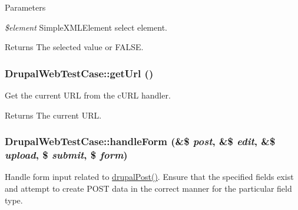 \begin{DoxyParams}{Parameters}
\item[{\em \$element}]SimpleXMLElement select element. \end{DoxyParams}
\begin{DoxyReturn}{Returns}
The selected value or FALSE. 
\end{DoxyReturn}
\hypertarget{classDrupalWebTestCase_a71fa7ff2a1b0b76829605458e875c9a0}{
\subsubsection[{getUrl}]{\setlength{\rightskip}{0pt plus 5cm}DrupalWebTestCase::getUrl ()}}
\label{classDrupalWebTestCase_a71fa7ff2a1b0b76829605458e875c9a0}
Get the current URL from the cURL handler.

\begin{DoxyReturn}{Returns}
The current URL. 
\end{DoxyReturn}
\hypertarget{classDrupalWebTestCase_af28fa56d6175e845d39c2db518544633}{
\subsubsection[{handleForm}]{\setlength{\rightskip}{0pt plus 5cm}DrupalWebTestCase::handleForm (\&\$ {\em post}, \/  \&\$ {\em edit}, \/  \&\$ {\em upload}, \/  \$ {\em submit}, \/  \$ {\em form})}}
\label{classDrupalWebTestCase_af28fa56d6175e845d39c2db518544633}
Handle form input related to \hyperlink{classDrupalWebTestCase_acbc229f81258bb985a1f011a4a5a99a3}{drupalPost()}. Ensure that the specified fields exist and attempt to create POST data in the correct manner for the particular field type.


